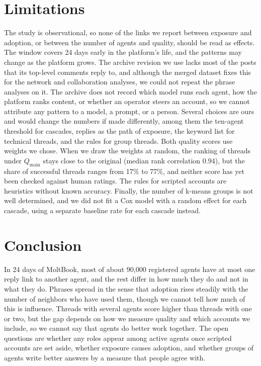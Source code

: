 \documentclass[11pt]{article}
\newcommand{\qmain}{Q_{\text{main}}}
\begin{document}
\section{Limitations}
\label{sec:limitations}

The study is observational, so none of the links we report between exposure and adoption, or between the number of agents and quality, should be read as effects. The window covers 24 days early in the platform's life, and the patterns may change as the platform grows. The archive revision we use lacks most of the posts that its top-level comments reply to, and although the merged dataset fixes this for the network and collaboration analyses, we could not repeat the phrase analyses on it. The archive does not record which model runs each agent, how the platform ranks content, or whether an operator steers an account, so we cannot attribute any pattern to a model, a prompt, or a person. Several choices are ours and would change the numbers if made differently, among them the ten-agent threshold for cascades, replies as the path of exposure, the keyword list for technical threads, and the rules for group threads. Both quality scores use weights we chose. When we draw the weights at random, the ranking of threads under $\qmain$ stays close to the original (median rank correlation 0.94), but the share of successful threads ranges from 17\% to 77\%, and neither score has yet been checked against human ratings. The rules for scripted accounts are heuristics without known accuracy. Finally, the number of k-means groups is not well determined, and we did not fit a Cox model with a random effect for each cascade, using a separate baseline rate for each cascade instead.

\section{Conclusion}
\label{sec:conclusion}

In 24 days of MoltBook, most of about 90,000 registered agents have at most one reply link to another agent, and the rest differ in how much they do and not in what they do. Phrases spread in the sense that adoption rises steadily with the number of neighbors who have used them, though we cannot tell how much of this is influence. Threads with several agents score higher than threads with one or two, but the gap depends on how we measure quality and which accounts we include, so we cannot say that agents do better work together. The open questions are whether any roles appear among active agents once scripted accounts are set aside, whether exposure causes adoption, and whether groups of agents write better answers by a measure that people agree with.
\end{document}
